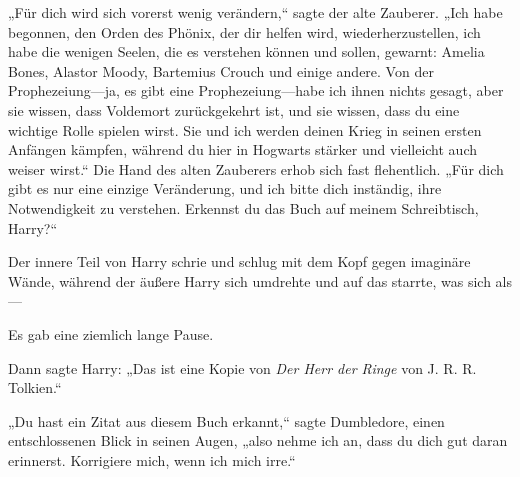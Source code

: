 „Für dich wird sich vorerst wenig verändern,“ sagte der alte Zauberer. „Ich habe begonnen, den Orden des Phönix, der dir helfen wird, wiederherzustellen, ich habe die wenigen Seelen, die es verstehen können und sollen, gewarnt: Amelia Bones, Alastor Moody, Bartemius Crouch und einige andere. Von der Prophezeiung—ja, es gibt eine Prophezeiung—habe ich ihnen nichts gesagt, aber sie wissen, dass Voldemort zurückgekehrt ist, und sie wissen, dass du eine wichtige Rolle spielen wirst. Sie und ich werden deinen Krieg in seinen ersten Anfängen kämpfen, während du hier in Hogwarts stärker und vielleicht auch weiser wirst.“ Die Hand des alten Zauberers erhob sich fast flehentlich. „Für dich gibt es nur eine einzige Veränderung, und ich bitte dich inständig, ihre Notwendigkeit zu verstehen. Erkennst du das Buch auf meinem Schreibtisch, Harry?“

Der innere Teil von Harry schrie und schlug mit dem Kopf gegen imaginäre Wände, während der äußere Harry sich umdrehte und auf das starrte, was sich als—

Es gab eine ziemlich lange Pause.

Dann sagte Harry: „Das ist eine Kopie von \emph{Der Herr der Ringe} von J. R. R. Tolkien.“

„Du hast ein Zitat aus diesem Buch erkannt,“ sagte Dumbledore, einen entschlossenen Blick in seinen Augen, „also nehme ich an, dass du dich gut daran erinnerst. Korrigiere mich, wenn ich mich irre.“

